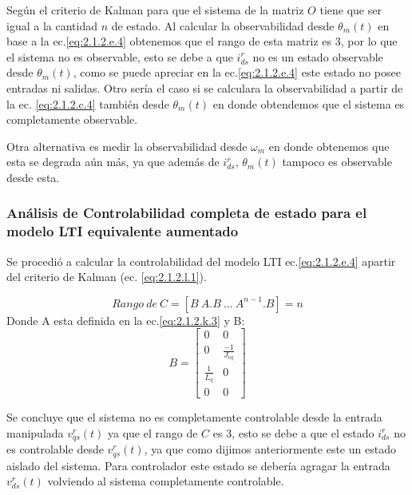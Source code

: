 \documentclass[10pt]{article}
\begin{document}
Según el criterio de Kalman para que el sistema de la matriz $O$ tiene que ser igual a la cantidad $n$ de estado. Al calcular la observabilidad desde $\theta_{m}(t)$ en base a la ec.\ref{eq:2.1.2.e.4} obtenemos que el rango de esta matriz es 3, por lo que el sistema no es observable, esto se debe a que $i^{r}_{ds}$ no es un estado observable desde $\theta_{m}(t)$, como se puede apreciar en la ec.\ref{eq:2.1.2.e.4} este estado no posee entradas ni salidas. Otro sería el caso si se calculara la observabilidad a partir de la ec. \ref{eq:2.1.2.c.4} también desde $\theta_{m}(t)$ en donde obtendemos que el sistema es completamente observable.

Otra alternativa es medir la observabilidad desde $\omega_{m}$ en donde obtenemos que esta se degrada aún más, ya que además de $i^{r}_{ds}$, $\theta_{m}(t)$ tampoco es observable desde esta. 

\subsubsection{Análisis de Controlabilidad completa de estado para el modelo LTI equivalente aumentado}
Se procedió a calcular la controlabilidad del modelo LTI ec.\ref{eq:2.1.2.e.4} apartir del criterio de Kalman (ec. \ref{eq:2.1.2.l.1}).

	\begin{equation}
		Rango \ de \ C=[B \ A.B \ ... \ A^{n-1}.B]= n
	\label{eq:2.1.2.l.1}
	\end{equation}
	Donde A esta definida en la ec.\ref{eq:2.1.2.k.3} y B:
	\begin{equation}
		B= \begin{bmatrix}
	0 &0 \\ 
	0 &\frac{-1}{J_{eq}} \\ 
	 \frac{1}{L_{q}}&0 \\
	 0&0
	\end{bmatrix}
	\label{eq:2.1.2.l.2}
	\end{equation}
	
Se concluye que el sistema no es completamente controlable desde la entrada manipulada $v^{r}_{qs}(t)$ ya que el rango de $C$ es 3, esto se debe a que el estado $i^{r}_{ds}$ no es controlable desde $v^{r}_{qs}(t)$, ya que como dijimos anteriormente este un estado aislado del sistema. Para controlador este estado se debería agragar la entrada $v^{r}_{ds}(t)$ volviendo al sistema completamente controlable.
\end{document}
